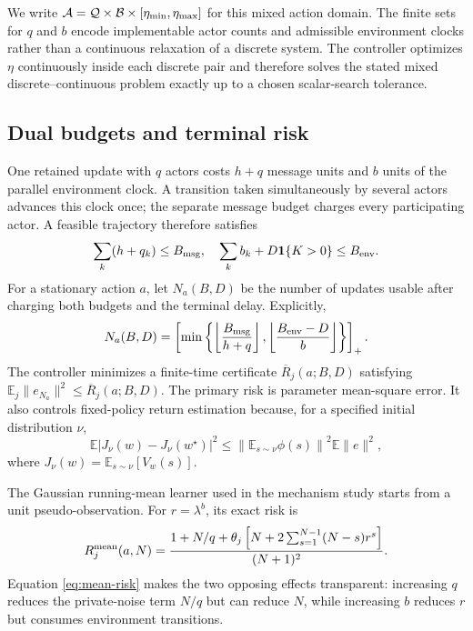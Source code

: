 \documentclass[journal]{IEEEtran}
\newcommand{\E}{\mathbb{E}}
\newcommand{\A}{\mathcal{A}}
\begin{document}
We write $\A={\cal Q}\times{\cal B}\times[\eta_{\min},\eta_{\max}]$ for this mixed action domain.
The finite sets for $q$ and $b$ encode implementable actor counts and admissible environment clocks rather than a continuous relaxation of a discrete system.
The controller optimizes $\eta$ continuously inside each discrete pair and therefore solves the stated mixed discrete--continuous problem exactly up to a chosen scalar-search tolerance.

\subsection{Dual budgets and terminal risk}
One retained update with $q$ actors costs $h+q$ message units and $b$ units of the parallel environment clock.
A transition taken simultaneously by several actors advances this clock once; the separate message budget charges every participating actor.
A feasible trajectory therefore satisfies
\begin{equation}
\sum_k(h+q_k)\le B_{\rm msg},
\quad
\sum_k b_k+D\mathbf{1}\{K>0\}\le B_{\rm env}.
\label{eq:budgets}
\end{equation}
For a stationary action $a$, let $N_a(B,D)$ be the number of updates usable after charging both budgets and the terminal delay.
Explicitly,
\begin{equation}
N_a(B,D)=\left[\min\left\{\left\lfloor\frac{B_{\rm msg}}{h+q}\right\rfloor,
\left\lfloor\frac{B_{\rm env}-D}{b}\right\rfloor\right\}\right]_+.
\label{eq:usable-horizon}
\end{equation}
The controller minimizes a finite-time certificate $\overline R_j(a;B,D)$ satisfying $\E_j\|e_{N_a}\|^2\le\overline R_j(a;B,D)$.
The primary risk is parameter mean-square error.
It also controls fixed-policy return estimation because, for a specified initial distribution $\nu$,
\begin{equation}
\E\left|J_\nu(w)-J_\nu(w^\star)\right|^2
\le \left\|\E_{s\sim\nu}\phi(s)\right\|^2\E\|e\|^2,
\label{eq:return-transfer}
\end{equation}
where $J_\nu(w)=\E_{s\sim\nu}[V_w(s)]$.

The Gaussian running-mean learner used in the mechanism study starts from a unit pseudo-observation.
For $r=\lambda^b$, its exact risk is
\begin{equation}
R_j^{\rm mean}(a,N)=
\frac{1+N/q+\theta_j\left[N+2\sum_{s=1}^{N-1}(N-s)r^s\right]}{(N+1)^2}.
\label{eq:mean-risk}
\end{equation}
Equation \eqref{eq:mean-risk} makes the two opposing effects transparent: increasing $q$ reduces the private-noise term $N/q$ but can reduce $N$, while increasing $b$ reduces $r$ but consumes environment transitions.
\end{document}
